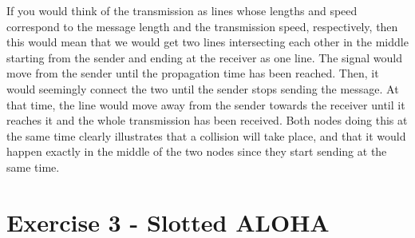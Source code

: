 \documentclass[10pt]{article}
\begin{document}
If you would think of the transmission as lines whose lengths and speed correspond to the message length and the transmission speed, respectively, then this would mean that we would get two lines intersecting each other in the middle starting from the sender and ending at the receiver as one line. The signal would move from the sender until the propagation time has been reached. Then, it would seemingly connect the two until the sender stops sending the message. At that time, the line would move away from the sender towards the receiver until it reaches it and the whole transmission has been received. Both nodes doing this at the same time clearly illustrates that a collision will take place, and that it would happen exactly in the middle of the two nodes since they start sending at the same time.
\section{Exercise 3 - Slotted ALOHA}
\end{document}
